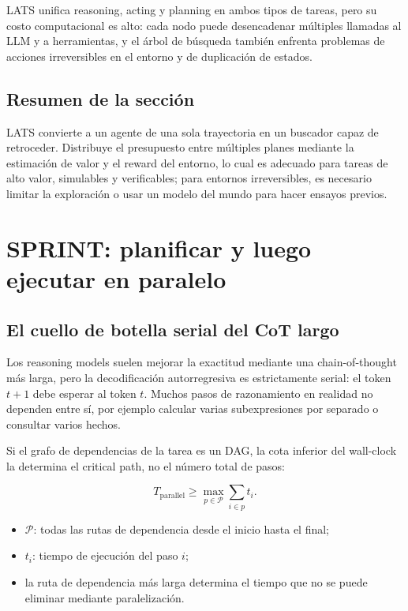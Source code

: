 \documentclass[a4paper]{article}
\begin{document}

LATS unifica reasoning, acting y planning en ambos tipos de tareas, pero su costo computacional es alto: cada nodo puede desencadenar múltiples llamadas al LLM y a herramientas, y el árbol de búsqueda también enfrenta problemas de acciones irreversibles en el entorno y de duplicación de estados.

\subsection{Resumen de la sección}

LATS convierte a un agente de una sola trayectoria en un buscador capaz de retroceder. Distribuye el presupuesto entre múltiples planes mediante la estimación de valor y el reward del entorno, lo cual es adecuado para tareas de alto valor, simulables y verificables; para entornos irreversibles, es necesario limitar la exploración o usar un modelo del mundo para hacer ensayos previos.
\section{SPRINT: planificar y luego ejecutar en paralelo}

\subsection{El cuello de botella serial del CoT largo}

Los reasoning models suelen mejorar la exactitud mediante una chain-of-thought más larga, pero la decodificación autorregresiva es estrictamente serial: el token $t+1$ debe esperar al token $t$. Muchos pasos de razonamiento en realidad no dependen entre sí, por ejemplo calcular varias subexpresiones por separado o consultar varios hechos.


Si el grafo de dependencias de la tarea es un DAG, la cota inferior del wall-clock la determina el critical path, no el número total de pasos:

$$
T_{\mathrm{parallel}}\ge \max_{p\in\mathcal P}\sum_{i\in p} t_i.
$$

\begin{itemize}
    \item $\mathcal P$: todas las rutas de dependencia desde el inicio hasta el final;
    \item $t_i$: tiempo de ejecución del paso $i$;
    \item la ruta de dependencia más larga determina el tiempo que no se puede eliminar mediante paralelización.
\end{itemize}
\end{document}
